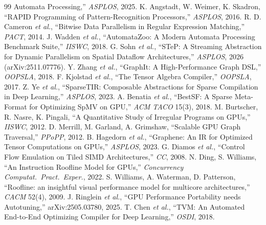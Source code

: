 \documentclass[conference]{IEEEtran}
\begin{document}
\begin{thebibliography}{99}
Automata Processing,'' \emph{ASPLOS}, 2025.
 K. Angstadt, W. Weimer, K. Skadron, ``RAPID Programming of
Pattern-Recognition Processors,'' \emph{ASPLOS}, 2016.
 R. D. Cameron \emph{et al.}, ``Bitwise Data Parallelism in Regular
Expression Matching,'' \emph{PACT}, 2014.
 J. Wadden \emph{et al.}, ``AutomataZoo: A Modern Automata Processing
Benchmark Suite,'' \emph{IISWC}, 2018.
 G. Sohn \emph{et al.}, ``STeP: A Streaming Abstraction for Dynamic
Parallelism on Spatial Dataflow Architectures,'' \emph{ASPLOS}, 2026 (arXiv:2511.07776).
 Y. Zhang \emph{et al.}, ``GraphIt: A High-Performance Graph DSL,''
\emph{OOPSLA}, 2018.
 F. Kjolstad \emph{et al.}, ``The Tensor Algebra Compiler,'' \emph{OOPSLA}, 2017.
 Z. Ye \emph{et al.}, ``SparseTIR: Composable Abstractions for Sparse
Compilation in Deep Learning,'' \emph{ASPLOS}, 2023.
 A. Benatia \emph{et al.}, ``BestSF: A Sparse Meta-Format for Optimizing
SpMV on GPU,'' \emph{ACM TACO} 15(3), 2018.
 M. Burtscher, R. Nasre, K. Pingali, ``A Quantitative Study of Irregular
Programs on GPUs,'' \emph{IISWC}, 2012.
 D. Merrill, M. Garland, A. Grimshaw, ``Scalable GPU Graph Traversal,''
\emph{PPoPP}, 2012.
 B. Hagedorn \emph{et al.}, ``Graphene: An IR for Optimized Tensor
Computations on GPUs,'' \emph{ASPLOS}, 2023.
 G. Diamos \emph{et al.}, ``Control Flow Emulation on Tiled SIMD
Architectures,'' \emph{CC}, 2008.
 N. Ding, S. Williams, ``An Instruction Roofline Model for GPUs,''
\emph{Concurrency Computat.\ Pract.\ Exper.}, 2022.
 S. Williams, A. Waterman, D. Patterson, ``Roofline: an insightful visual
performance model for multicore architectures,'' \emph{CACM} 52(4), 2009.
 J. Ringlein \emph{et al.}, ``GPU Performance Portability needs
Autotuning,'' arXiv:2505.03780, 2025.
 T. Chen \emph{et al.}, ``TVM: An Automated End-to-End Optimizing Compiler for
Deep Learning,'' \emph{OSDI}, 2018.
\end{thebibliography}
\end{document}
